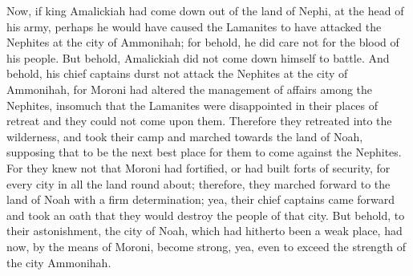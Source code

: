 Now, if king Amalickiah had come down out of the land of Nephi, at the head of his army, perhaps he would have caused the Lamanites to have attacked the Nephites at the city of Ammonihah; for behold, he did care not for the blood of his people.
\bverse \iffalse But behold, Amalickiah did not come down himself to battle.  And behold, his chief captains durst not attack the Nephites at the city of Ammonihah, for Moroni had altered the management of affairs among the Nephites, insomuch that the Lamanites were disappointed in their places of retreat and they could not come upon them. \fi
But behold, Amalickiah did not come down himself to battle.  And behold, his chief captains durst not attack the Nephites at the city of Ammonihah, for Moroni had altered the management of affairs among the Nephites, insomuch that the Lamanites were disappointed in their places of retreat and they could not come upon them.
\bverse \iffalse Therefore they retreated into the wilderness, and took their camp and marched towards the land of Noah, supposing that to be the next best place for them to come against the Nephites. \fi
Therefore they retreated into the wilderness, and took their camp and marched towards the land of Noah, supposing that to be the next best place for them to come against the Nephites.
\bverse \iffalse For they knew not that Moroni had fortified, or had built forts of security, for every city in all the land round about; therefore, they marched forward to the land of Noah with a firm determination; yea, their chief captains came forward and took an oath that they would destroy the people of that city. \fi
For they knew not that Moroni had fortified, or had built forts of security, for every city in all the land round about; therefore, they marched forward to the land of Noah with a firm determination; yea, their chief captains came forward and took an oath that they would destroy the people of that city.
\bverse \iffalse But behold, to their astonishment, the city of Noah, which had hitherto been a weak place, had now, by the means of Moroni, become strong, yea, even to exceed the strength of the city Ammonihah. \fi
But behold, to their astonishment, the city of Noah, which had hitherto been a weak place, had now, by the means of Moroni, become strong, yea, even to exceed the strength of the city Ammonihah.
\bverse \iffalse And now, behold, this was wisdom in Moroni; for he had supposed that they would be frightened at the city Ammonihah; and as the city of Noah had hitherto been the weakest part of the land, therefore they would march thither to battle; and thus it was according to his desires. \fi
